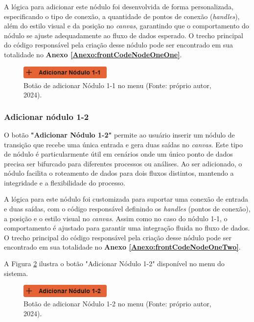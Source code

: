 A lógica para adicionar este nódulo foi desenvolvida de forma personalizada, especificando o tipo de conexão, a quantidade de pontos de conexão (\textit{handles}), além do estilo visual e da posição no \textit{canvas}, garantindo que o comportamento do nódulo se ajuste adequadamente ao fluxo de dados esperado. O trecho principal do código responsável pela criação desse nódulo pode ser encontrado em sua totalidade no \textbf{Anexo \ref{Anexo:frontCodeNodeOneOne}}.

\begin{figure}[htbp]
    \centering
    \includegraphics[width=0.4\textwidth]{figuras/add-node11-button.png}
    \caption{Botão de adicionar Nódulo 1-1 no menu (Fonte: próprio autor, 2024).}
    \label{Fig:AddNodeOneOneButton}
\end{figure}

\subsubsection{Adicionar nódulo 1-2}

O botão \textbf{"Adicionar Nódulo 1-2"} permite ao usuário inserir um nódulo de transição que recebe uma única entrada e gera duas saídas no \textit{canvas}. Este tipo de nódulo é particularmente útil em cenários onde um único ponto de dados precisa ser bifurcado para diferentes processos ou análises. Ao ser adicionado, o nódulo facilita o roteamento de dados para dois fluxos distintos, mantendo a integridade e a flexibilidade do processo.

A lógica para este nódulo foi customizada para suportar uma conexão de entrada e duas saídas, com o código responsável definindo os \textit{handles} (pontos de conexão), a posição e o estilo visual no \textit{canvas}. Assim como no caso do nódulo 1-1, o comportamento é ajustado para garantir uma integração fluida no fluxo de dados. O trecho principal do código responsável pela criação desse nódulo pode ser encontrado em sua totalidade no \textbf{Anexo \ref{Anexo:frontCodeNodeOneTwo}}.

A Figura \ref{Fig:AddNodeOneTwoButton} ilustra o botão "Adicionar Nódulo 1-2" disponível no menu do sistema.

\begin{figure}[htbp]
    \centering
    \includegraphics[width=0.4\textwidth]{figuras/add-node12-button.png}
    \caption{Botão de adicionar Nódulo 1-2 no menu (Fonte: próprio autor, 2024).}
    \label{Fig:AddNodeOneTwoButton}
\end{figure}

